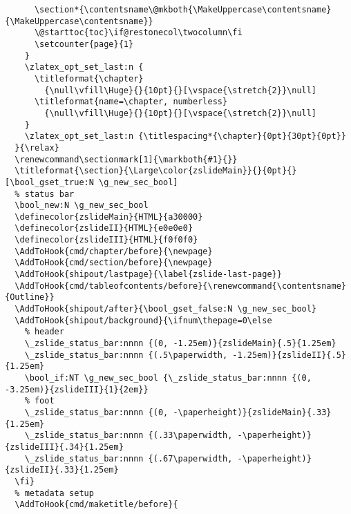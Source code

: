 \begin{verbatim}
      \section*{\contentsname\@mkboth{\MakeUppercase\contentsname}{\MakeUppercase\contentsname}}
      \@starttoc{toc}\if@restonecol\twocolumn\fi
      \setcounter{page}{1}
    }
    \zlatex_opt_set_last:n {
      \titleformat{\chapter}
        {\null\vfill\Huge}{}{10pt}{}[\vspace{\stretch{2}}\null]
      \titleformat{name=\chapter, numberless}
        {\null\vfill\Huge}{}{10pt}{}[\vspace{\stretch{2}}\null]
    }
    \zlatex_opt_set_last:n {\titlespacing*{\chapter}{0pt}{30pt}{0pt}}
  }{\relax}
  \renewcommand\sectionmark[1]{\markboth{#1}{}}
  \titleformat{\section}{\Large\color{zslideMain}}{}{0pt}{}[\bool_gset_true:N \g_new_sec_bool]
  % status bar
  \bool_new:N \g_new_sec_bool
  \definecolor{zslideMain}{HTML}{a30000}
  \definecolor{zslideII}{HTML}{e0e0e0}
  \definecolor{zslideIII}{HTML}{f0f0f0}
  \AddToHook{cmd/chapter/before}{\newpage}
  \AddToHook{cmd/section/before}{\newpage}
  \AddToHook{shipout/lastpage}{\label{zslide-last-page}}
  \AddToHook{cmd/tableofcontents/before}{\renewcommand{\contentsname}{Outline}}
  \AddToHook{shipout/after}{\bool_gset_false:N \g_new_sec_bool}
  \AddToHook{shipout/background}{\ifnum\thepage=0\else
    % header
    \_zslide_status_bar:nnnn {(0, -1.25em)}{zslideMain}{.5}{1.25em}
    \_zslide_status_bar:nnnn {(.5\paperwidth, -1.25em)}{zslideII}{.5}{1.25em}
    \bool_if:NT \g_new_sec_bool {\_zslide_status_bar:nnnn {(0, -3.25em)}{zslideIII}{1}{2em}}
    % foot
    \_zslide_status_bar:nnnn {(0, -\paperheight)}{zslideMain}{.33}{1.25em}
    \_zslide_status_bar:nnnn {(.33\paperwidth, -\paperheight)}{zslideIII}{.34}{1.25em}
    \_zslide_status_bar:nnnn {(.67\paperwidth, -\paperheight)}{zslideII}{.33}{1.25em}
  \fi}
  % metadata setup
  \AddToHook{cmd/maketitle/before}{

\end{verbatim}
